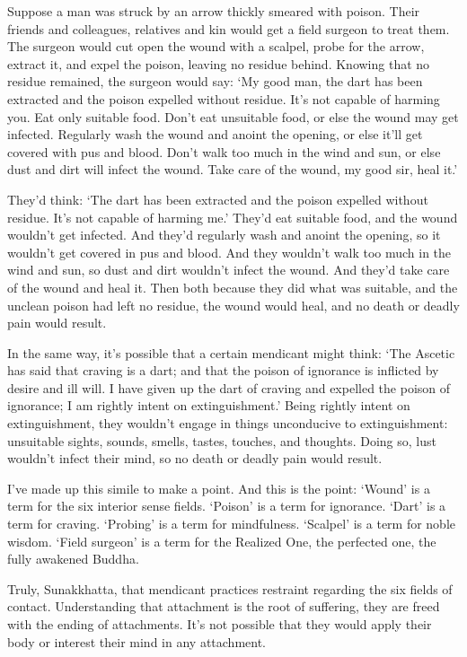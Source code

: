 \documentclass[12pt,openany]{book}%
\begin{document}
Suppose a man was struck by an arrow thickly smeared with poison. Their friends and colleagues, relatives and kin would get a field surgeon to treat them. The surgeon would cut open the wound with a scalpel, probe for the arrow, extract it, and expel the poison, leaving no residue behind. Knowing that no residue remained, the surgeon would say: ‘My good man, the dart has been extracted and the poison expelled without residue. It’s not capable of harming you. Eat only suitable food. Don’t eat unsuitable food, or else the wound may get infected. Regularly wash the wound and anoint the opening, or else it’ll get covered with pus and blood. Don’t walk too much in the wind and sun, or else dust and dirt will infect the wound. Take care of the wound, my good sir, heal it.’ 

They’d think: ‘The dart has been extracted and the poison expelled without residue. It’s not capable of harming me.’ They’d eat suitable food, and the wound wouldn’t get infected. And they’d regularly wash and anoint the opening, so it wouldn’t get covered in pus and blood. And they wouldn’t walk too much in the wind and sun, so dust and dirt wouldn’t infect the wound. And they’d take care of the wound and heal it. Then both because they did what was suitable, and the unclean poison had left no residue, the wound would heal, and no death or deadly pain would result. 

In the same way, it’s possible that a certain mendicant might think: ‘The Ascetic has said that craving is a dart; and that the poison of ignorance is inflicted by desire and ill will. I have given up the dart of craving and expelled the poison of ignorance; I am rightly intent on extinguishment.’ Being rightly intent on extinguishment, they wouldn’t engage in things unconducive to extinguishment: unsuitable sights, sounds, smells, tastes, touches, and thoughts. Doing so, lust wouldn’t infect their mind, so no death or deadly pain would result. 

I’ve made up this simile to make a point. And this is the point: ‘Wound’ is a term for the six interior sense fields. ‘Poison’ is a term for ignorance. ‘Dart’ is a term for craving. ‘Probing’ is a term for mindfulness. ‘Scalpel’ is a term for noble wisdom. ‘Field surgeon’ is a term for the Realized One, the perfected one, the fully awakened Buddha. 

Truly, Sunakkhatta, that mendicant practices restraint regarding the six fields of contact. Understanding that attachment is the root of suffering, they are freed with the ending of attachments. It’s not possible that they would apply their body or interest their mind in any attachment. 
\end{document}

